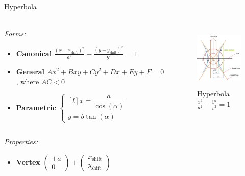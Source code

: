 \documentclass[aspectratio=169]{beamer}
\newcommand{\shf}{\text{shift}}
\begin{document}
    \begin{frame}[t]{Hyperbola}
        \framesubtitle{}
            \scriptsize
            \vspace{-0.4cm}
        \begin{columns}[T,onlytextwidth]
            \begin{column}{0.59\textwidth}
                \textit{Forms:} \\
                \begin{itemize}
                    \item \textbf{Canonical} $\frac{(x-x_{\shf})^2}{a^2}-\frac{(y-y_{\shf})^2}{b^2}=1$
                    \item \textbf{General} $Ax^2+Bxy+Cy^2+Dx+Ey+F=0$, where $AC < 0$
                    \item \textbf{Parametric} $\left\{\begin{matrix*}[l] x = \dfrac{a}{\cos(\alpha)}\\ y = b\tan(\alpha) \end{matrix*}\right.$
                \end{itemize}
            \end{column}
            \begin{column}{0.39\textwidth}
                \vspace{-0.5cm}
                \begin{figure}[H]
                    \centering\includegraphics[height=3cm,width=1\textwidth,keepaspectratio]{Hyperbola.jpg}
                    \vspace{-0.4cm}
                    \caption*{\scriptsize Hyperbola $\frac{x^2}{a^2}-\frac{y^2}{b^2}=1$}
                    \label{fig:Hyperbola.jpg}
                \end{figure}
            \end{column}
        \end{columns}
        \vspace{-0.7cm}
        \textit{Properties:}
        \begin{multicols}{3}
            \begin{itemize}
                \item \textbf{Vertex} $\begin{pmatrix} \pm a\\0 \end{pmatrix} + \begin{pmatrix} x_{\shf}\\y_{\shf} \end{pmatrix}$ 

\end{itemize}
\end{multicols}
\end{frame}
\end{document}
